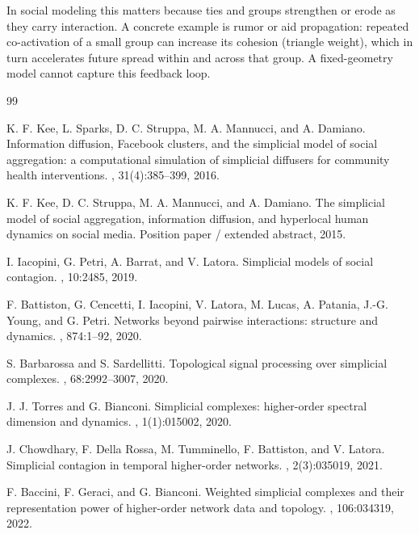 \documentclass[11pt]{article}
\begin{document}
In social modeling this matters because ties and groups strengthen or erode as they carry interaction.  A concrete example is rumor or aid propagation: repeated co-activation of a small group can increase its cohesion (triangle weight), which in turn accelerates future spread within and across that group.  A fixed-geometry model cannot capture this feedback loop.

\begin{thebibliography}{99}

K. F. Kee, L. Sparks, D. C. Struppa, M. A. Mannucci, and A. Damiano.
\newblock Information diffusion, Facebook clusters, and the simplicial model of social aggregation: a computational simulation of simplicial diffusers for community health interventions.
, 31(4):385--399, 2016.

K. F. Kee, D. C. Struppa, M. A. Mannucci, and A. Damiano.
\newblock The simplicial model of social aggregation, information diffusion, and hyperlocal human dynamics on social media.
\newblock Position paper / extended abstract, 2015.

I. Iacopini, G. Petri, A. Barrat, and V. Latora.
\newblock Simplicial models of social contagion.
, 10:2485, 2019.

F. Battiston, G. Cencetti, I. Iacopini, V. Latora, M. Lucas, A. Patania, J.-G. Young, and G. Petri.
\newblock Networks beyond pairwise interactions: structure and dynamics.
, 874:1--92, 2020.

S. Barbarossa and S. Sardellitti.
\newblock Topological signal processing over simplicial complexes.
, 68:2992--3007, 2020.

J. J. Torres and G. Bianconi.
\newblock Simplicial complexes: higher-order spectral dimension and dynamics.
, 1(1):015002, 2020.

J. Chowdhary, F. Della Rossa, M. Tumminello, F. Battiston, and V. Latora.
\newblock Simplicial contagion in temporal higher-order networks.
, 2(3):035019, 2021.

F. Baccini, F. Geraci, and G. Bianconi.
\newblock Weighted simplicial complexes and their representation power of higher-order network data and topology.
, 106:034319, 2022.


\end{thebibliography}
\end{document}
